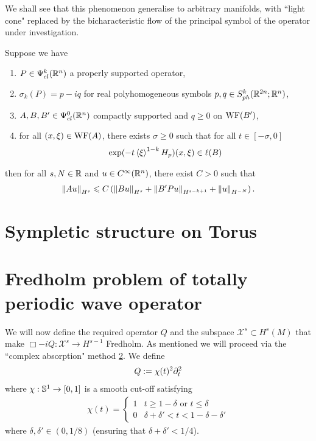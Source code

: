 \documentclass[12pt]{article}
\begin{document}
 We shall see that this phenomenon generalise to arbitrary manifolds, with ``light cone" replaced by the bicharacteristic flow of the principal symbol of the operator under investigation. 


\begin{ftheorem} 
    Suppose we have 
    \begin{enumerate}
        \item $P \in \Psi^k_{cl}(\R^n)$ a properly supported operator,
        \item $\sigma_{k}(P) = p - iq$ for real polyhomogeneous symbols $p, q \in S^{k}_{ph}(\R^{2n}; \R^{n})$, 
        \item $A, B, B' \in \Psi^{0}_{cl}(\R^n)$ compactly supported and $q \geq 0 $ on $\WF(B')$, 
        \item for all $(x, \xi) \in \WF(A)$, there exists $\sigma \geq 0$ such that for all $t \in [-\sigma, 0]$
        \begin{align*}
            \exp(-t\sym[\xi]^{1-k}H_p)(x, \xi) \in \ell(B)
        \end{align*}
    \end{enumerate}
    then for all $s, N \in \R$ and $u \in C^\infty(\R^n)$, there exist $C > 0$ such that 
    \begin{align*}
        \norm[Au]_{H^s} \leq C\brac{\norm[Bu]_{H^s} + \norm[B'Pu]_{H^{s - k + 1}} + \norm[u]_{H^{-N}}}. 
    \end{align*}
\end{ftheorem}


\section{Sympletic structure on Torus} 


\section{Fredholm problem of totally periodic wave operator} 
We will now define the required operator $Q$ and the subspace $\mathcal{X}^s \subset H^{s}(M)$ that make $\Box - iQ: \mathcal{X}^s \to H^{s -1}$ Fredholm.  As mentioned we will proceed via the ``complex absorption" method \ref{}. We define
\begin{align*}
Q := \chi(t)^2 \p_t^2
\end{align*}
where $\chi : \S^1 \to [0, 1]$ is a smooth cut-off satisfying
\begin{align*}
\chi(t) = 
\begin{cases}
1 & t \geq  1 - \delta \text{ or } t \leq \delta \\
0 &  \delta + \delta' < t < 1 - \delta - \delta'
\end{cases}
\end{align*}
where $\delta, \delta' \in (0, 1/8)$ (ensuring that $\delta+ \delta' < 1/4$). 
\end{document}
